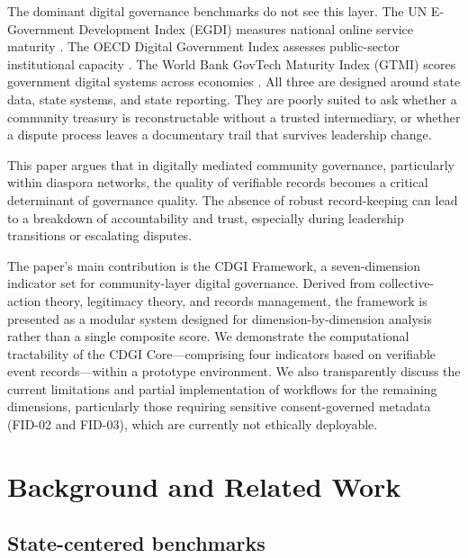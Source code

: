\documentclass[review,onecolumn]{elsarticle}
\begin{document}
The dominant digital governance benchmarks do not see this layer. The UN E-Government Development Index (EGDI) measures national online service maturity \cite{un2022}. The OECD Digital Government Index assesses public-sector institutional capacity \cite{oecd2020}. The World Bank GovTech Maturity Index (GTMI) scores government digital systems across economies \cite{wb2021}. All three are designed around state data, state systems, and state reporting. They are poorly suited to ask whether a community treasury is reconstructable without a trusted intermediary, or whether a dispute process leaves a documentary trail that survives leadership change.

This paper argues that in digitally mediated community governance, particularly within diaspora networks, the quality of verifiable records becomes a critical determinant of governance quality. The absence of robust record-keeping can lead to a breakdown of accountability and trust, especially during leadership transitions or escalating disputes.

The paper’s main contribution is the CDGI Framework, a seven-dimension indicator set for community-layer digital governance. Derived from collective-action theory, legitimacy theory, and records management, the framework is presented as a modular system designed for dimension-by-dimension analysis rather than a single composite score. We demonstrate the computational tractability of the CDGI Core—comprising four indicators based on verifiable event records—within a prototype environment. We also transparently discuss the current limitations and partial implementation of workflows for the remaining dimensions, particularly those requiring sensitive consent-governed metadata (FID-02 and FID-03), which are currently not ethically deployable.

\section{Background and Related Work}

\subsection{State-centered benchmarks}
\end{document}

